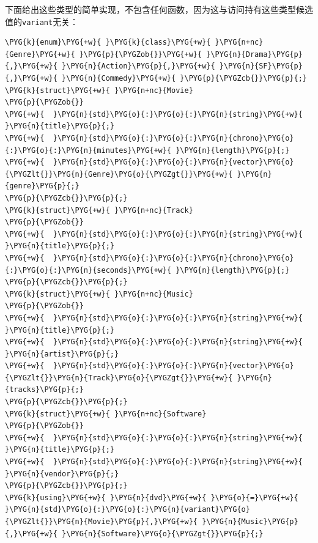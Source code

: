 
下面给出这些类型的简单实现，不包含任何函数，因为这与访问持有这些类型候选值的\texttt{variant}无关：



\begin{codeblockbg}
\begin{Verbatim}[commandchars=\\\{\},breaklines=true,breakanywhere=true,fontsize=\codefont,xleftmargin=17bp]
\PYG{k}{enum}\PYG{+w}{ }\PYG{k}{class}\PYG{+w}{ }\PYG{n+nc}{Genre}\PYG{+w}{ }\PYG{p}{\PYGZob{}}\PYG{+w}{ }\PYG{n}{Drama}\PYG{p}{,}\PYG{+w}{ }\PYG{n}{Action}\PYG{p}{,}\PYG{+w}{ }\PYG{n}{SF}\PYG{p}{,}\PYG{+w}{ }\PYG{n}{Commedy}\PYG{+w}{ }\PYG{p}{\PYGZcb{}}\PYG{p}{;}
\PYG{k}{struct}\PYG{+w}{ }\PYG{n+nc}{Movie}
\PYG{p}{\PYGZob{}}
\PYG{+w}{  }\PYG{n}{std}\PYG{o}{:}\PYG{o}{:}\PYG{n}{string}\PYG{+w}{ }\PYG{n}{title}\PYG{p}{;}
\PYG{+w}{  }\PYG{n}{std}\PYG{o}{:}\PYG{o}{:}\PYG{n}{chrono}\PYG{o}{:}\PYG{o}{:}\PYG{n}{minutes}\PYG{+w}{ }\PYG{n}{length}\PYG{p}{;}
\PYG{+w}{  }\PYG{n}{std}\PYG{o}{:}\PYG{o}{:}\PYG{n}{vector}\PYG{o}{\PYGZlt{}}\PYG{n}{Genre}\PYG{o}{\PYGZgt{}}\PYG{+w}{ }\PYG{n}{genre}\PYG{p}{;}
\PYG{p}{\PYGZcb{}}\PYG{p}{;}
\PYG{k}{struct}\PYG{+w}{ }\PYG{n+nc}{Track}
\PYG{p}{\PYGZob{}}
\PYG{+w}{  }\PYG{n}{std}\PYG{o}{:}\PYG{o}{:}\PYG{n}{string}\PYG{+w}{ }\PYG{n}{title}\PYG{p}{;}
\PYG{+w}{  }\PYG{n}{std}\PYG{o}{:}\PYG{o}{:}\PYG{n}{chrono}\PYG{o}{:}\PYG{o}{:}\PYG{n}{seconds}\PYG{+w}{ }\PYG{n}{length}\PYG{p}{;}
\PYG{p}{\PYGZcb{}}\PYG{p}{;}
\PYG{k}{struct}\PYG{+w}{ }\PYG{n+nc}{Music}
\PYG{p}{\PYGZob{}}
\PYG{+w}{  }\PYG{n}{std}\PYG{o}{:}\PYG{o}{:}\PYG{n}{string}\PYG{+w}{ }\PYG{n}{title}\PYG{p}{;}
\PYG{+w}{  }\PYG{n}{std}\PYG{o}{:}\PYG{o}{:}\PYG{n}{string}\PYG{+w}{ }\PYG{n}{artist}\PYG{p}{;}
\PYG{+w}{  }\PYG{n}{std}\PYG{o}{:}\PYG{o}{:}\PYG{n}{vector}\PYG{o}{\PYGZlt{}}\PYG{n}{Track}\PYG{o}{\PYGZgt{}}\PYG{+w}{ }\PYG{n}{tracks}\PYG{p}{;}
\PYG{p}{\PYGZcb{}}\PYG{p}{;}
\PYG{k}{struct}\PYG{+w}{ }\PYG{n+nc}{Software}
\PYG{p}{\PYGZob{}}
\PYG{+w}{  }\PYG{n}{std}\PYG{o}{:}\PYG{o}{:}\PYG{n}{string}\PYG{+w}{ }\PYG{n}{title}\PYG{p}{;}
\PYG{+w}{  }\PYG{n}{std}\PYG{o}{:}\PYG{o}{:}\PYG{n}{string}\PYG{+w}{ }\PYG{n}{vendor}\PYG{p}{;}
\PYG{p}{\PYGZcb{}}\PYG{p}{;}
\PYG{k}{using}\PYG{+w}{ }\PYG{n}{dvd}\PYG{+w}{ }\PYG{o}{=}\PYG{+w}{ }\PYG{n}{std}\PYG{o}{:}\PYG{o}{:}\PYG{n}{variant}\PYG{o}{\PYGZlt{}}\PYG{n}{Movie}\PYG{p}{,}\PYG{+w}{ }\PYG{n}{Music}\PYG{p}{,}\PYG{+w}{ }\PYG{n}{Software}\PYG{o}{\PYGZgt{}}\PYG{p}{;}
\end{Verbatim}
\end{codeblockbg}


